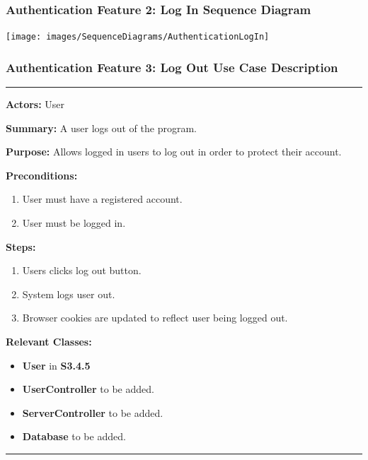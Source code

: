 \documentclass[twoside,letterpaper]{article}
\begin{document}
\subsubsection[Authentication Feature 2: Log In Sequence Diagram]{\rmfamily\bfseries\color{black}
	Authentication Feature 2: Log In Sequence Diagram}
\hypertarget{RefHeading22059017292}{}

\bigskip

\texttt{[image: images/SequenceDiagrams/AuthenticationLogIn]}

\newpage

\subsubsection[Authentication Feature 3: Log Out Use Case Description]{\rmfamily\bfseries\color{black}
	Authentication Feature 3: Log Out Use Case Description}
\hypertarget{RefHeading22059017292}{}

\hrule
\vspace{8pt}
\noindent\textbf{Actors:} User \newline

\noindent\textbf{Summary:} A user logs out of the program.  \newline

\noindent\textbf{Purpose:} Allows logged in users to log out in order to protect their account.  \newline

\noindent\textbf{Preconditions:}
\begin{enumerate}
	\item User must have a registered account.
	\item User must be logged in.
\end{enumerate}

\noindent\textbf{Steps:}
\begin{enumerate}
	\item Users clicks log out button.
	\item System logs user out.
	\item Browser cookies are updated to reflect user being logged out.
\end{enumerate}

\noindent\textbf{Relevant Classes:}
\begin{itemize}
	\item \textbf{User} in \textbf{S3.4.5}
	\item \textbf{UserController} to be added.
	\item \textbf{ServerController} to be added.
	\item \textbf{Database} to be added.
\end{itemize}
\vspace{8pt}
\hrule
\newpage
\end{document}
